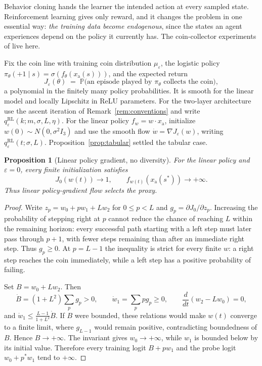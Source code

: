 \documentclass[11pt]{amsart}
\theoremstyle{plain}
\newtheorem{proposition}[theorem]{Proposition}
\theoremstyle{definition}
\begin{document}
Behavior cloning hands the learner the intended action at every sampled state. Reinforcement learning gives only reward, and it changes the problem in one essential way: \emph{the training data become endogenous}, since the states an agent experiences depend on the policy it currently has. The coin-collector experiments of \cite{langosco2022} live here.

Fix the coin line with training coin distribution $\mu_\varepsilon$, the logistic policy $\pi_\theta(+1\mid s)=\sigma(f_\theta(x_{\mathrm a}(s)))$, and the expected return
\[
   J_\varepsilon(\theta)\;=\;\mathbb P\bigl(\text{an episode played by }\pi_\theta\text{ collects the coin}\bigr),
\]
a polynomial in the finitely many policy probabilities. It is smooth for the linear model and locally Lipschitz in ReLU parameters. For the two-layer architecture use the ascent iteration of Remark~\ref{rem:conventions} and write $q^{\mathrm{RL}}_\varepsilon(k;m,\sigma,L,\eta)$. For the linear policy $f_w=w\cdot x_{\mathrm a}$, initialize $w(0)\sim N(0,\sigma^2I_3)$ and use the smooth flow $\dot w=\nabla J_\varepsilon(w)$, writing $q^{\mathrm{RL}}_\varepsilon(t;\sigma,L)$. Proposition~\ref{prop:tabular} settled the tabular case.

\begin{proposition}[Linear policy gradient, no diversity]\label{prop:linearpg}
For the linear policy and $\varepsilon=0$, every finite initialization satisfies
\[
J_0(w(t))\longrightarrow1,
\qquad
f_{w(t)}(x_{\mathrm a}(s^*))\longrightarrow+\infty.
\]
Thus linear policy-gradient flow selects the proxy.
\end{proposition}

\begin{proof}
Write $z_p=w_0+pw_1+Lw_2$ for $0\le p<L$ and $g_p=\partial J_0/\partial z_p$. Increasing the probability of stepping right at $p$ cannot reduce the chance of reaching $L$ within the remaining horizon: every successful path starting with a left step must later pass through $p+1$, with fewer steps remaining than after an immediate right step. Thus $g_p\ge0$. At $p=L-1$ the inequality is strict for every finite $w$: a right step reaches the coin immediately, while a left step has a positive probability of failing.

Set $B=w_0+Lw_2$. Then
\[
\dot B=(1+L^2)\sum_pg_p>0,\qquad
\dot w_1=\sum_ppg_p\ge0,\qquad
\frac{d}{dt}(w_2-Lw_0)=0,
\]
and $\dot w_1\le\frac{L-1}{1+L^2}\dot B$. If $B$ were bounded, these relations would make $w(t)$ converge to a finite limit, where $g_{L-1}$ would remain positive, contradicting boundedness of $B$. Hence $B\to+\infty$. The invariant gives $w_0\to+\infty$, while $w_1$ is bounded below by its initial value. Therefore every training logit $B+pw_1$ and the probe logit $w_0+p^*w_1$ tend to $+\infty$.
\end{proof}
\end{document}
